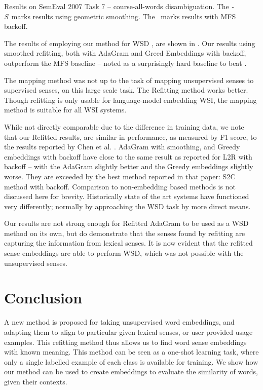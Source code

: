 {\begin{table}
	\caption{Results on SemEval 2007 Task 7 -- course-all-words disambiguation.
	The \mbox{\emph{-S} marks} results using geometric smoothing.
	The \mbox{\emph{\textasteriskcentered } marks} results with MFS backoff.
	} \label{samevalres}
\end{table}

The results of employing our method for WSD , are shown in .
Our results using smoothed refitting, both with AdaGram and Greed Embeddings with backoff, outperform the MFS baseline  \cite{Navigli:2007:STC:1621474.1621480}  -- noted as a surprisingly hard baseline to beat \parencite{Chen2014}.

The mapping method \parencite{agirre2006}  was not up to the task of mapping unsupervised senses to supervised senses, on this large scale task.
The Refitting method works better.
Though refitting is only usable for language-model embedding WSI, the mapping method is suitable for all WSI systems.

While not directly comparable due to the difference in training data, we note that our Refitted results, are similar in performance, as measured by F1 score, to the results reported by Chen et al. \parencite{Chen2014}.
AdaGram with smoothing, and Greedy embeddings with backoff have close to the same result as reported for L2R with backoff -- with the AdaGram slightly better and the Greedy embeddings slightly worse.
They are exceeded by the best method reported in that paper: S2C method with backoff.
Comparison to non-embedding based methods is not discussed here for brevity.
Historically state of the art systems have functioned very differently; normally by approaching the WSD task by more direct means. %


Our results are not strong enough for Refitted AdaGram to be used as a WSD method on its own, but do demonstrate that the senses found by refitting are capturing the information from lexical senses.
It is now evident that the refitted sense embeddings are able to perform WSD, which was not possible with the unsupervised senses. 

\section{Conclusion}\label{conclusionRS}

A new method is proposed for taking unsupervised word embeddings, and adapting them to align to particular given lexical senses, or user provided usage examples. 
This refitting method thus allows us to find word sense embeddings with known meaning.
This method can be seen as a one-shot learning task, where only a single labelled example of each class is available for training.
We show how our method can be used to create embeddings to evaluate the similarity of words, given their contexts.

}
